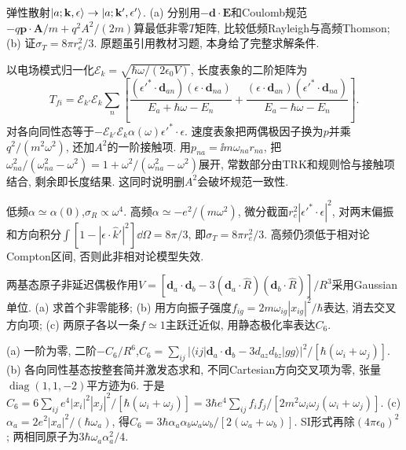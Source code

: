 \begin{exercise}弹性散射$\lvert a;\mathbf k,\epsilon\rangle\to\lvert a;\mathbf k',\epsilon'\rangle$. (a) 分别用$-\mathbf d\cdot\mathbf E$和Coulomb规范$-q\mathbf p\cdot\mathbf A/m+q^2A^2/(2m)$算最低非零$T$矩阵, 比较低频Rayleigh与高频Thomson; (b) 证$\sigma_T=8\pi r_e^2/3$. 原题虽引用教材习题, 本身给了完整求解条件.\end{exercise}
\begin{solution}以电场模式归一化$\mathcal E_k=\sqrt{\hbar\omega/(2\epsilon_0V)}$, 长度表象的二阶矩阵为
\[T_{fi}=\mathcal E_{k'}\mathcal E_k\sum_n\left[\frac{(\epsilon'^*\cdot\mathbf d_{an})(\epsilon\cdot\mathbf d_{na})}{E_a+\hbar\omega-E_n}+\frac{(\epsilon\cdot\mathbf d_{an})(\epsilon'^*\cdot\mathbf d_{na})}{E_a-\hbar\omega-E_n}\right].\]
对各向同性态等于$-\mathcal E_{k'}\mathcal E_k\alpha(\omega)\epsilon'^*\cdot\epsilon$. 速度表象把两偶极因子换为$p$并乘$q^2/(m^2\omega^2)$, 还加$A^2$的一阶接触项. 用$p_{na}=\ii m\omega_{na}r_{na}$, 把$\omega_{na}^2/(\omega_{na}^2-\omega^2)=1+\omega^2/(\omega_{na}^2-\omega^2)$展开, 常数部分由TRK和规则恰与接触项结合, 剩余即长度结果. 这同时说明删$A^2$会破坏规范一致性.

低频$\alpha\simeq\alpha(0)$,$\sigma_R\propto\omega^4$. 高频$\alpha\simeq-e^2/(m\omega^2)$, 微分截面$r_e^2|\epsilon'^*\cdot\epsilon|^2$, 对两末偏振和方向积分$\int[1-|\epsilon\cdot\hat k'|^2]\dd\Omega=8\pi/3$, 即$\sigma_T=8\pi r_e^2/3$. 高频仍须低于相对论Compton区间, 否则此非相对论模型失效.
\end{solution}
\begin{exercise}两基态原子非延迟偶极作用$V=[\mathbf d_a\cdot\mathbf d_b-3(\mathbf d_a\cdot\hat R)(\mathbf d_b\cdot\hat R)]/R^3$采用Gaussian单位. (a) 求首个非零能移; (b) 用方向振子强度$f_{ig}=2m\omega_{ig}|x_{ig}|^2/\hbar$表达, 消去交叉方向项; (c) 两原子各以一条$f\simeq1$主跃迁近似, 用静态极化率表达$C_6$.\end{exercise}
\begin{solution}(a) 一阶为零, 二阶$-C_6/R^6$,$C_6=\sum_{ij}|\langle ij|\mathbf d_a\cdot\mathbf d_b-3d_{az}d_{bz}|gg\rangle|^2/[\hbar(\omega_i+\omega_j)]$. (b) 各向同性基态按整套简并激发态求和, 不同Cartesian方向交叉项为零, 张量$\operatorname{diag}(1,1,-2)$平方迹为6. 于是$C_6=6\sum_{ij}e^4|x_i|^2|x_j|^2/[\hbar(\omega_i+\omega_j)]=3\hbar e^4\sum_{ij}f_if_j/[2m^2\omega_i\omega_j(\omega_i+\omega_j)]$. (c) $\alpha_a=2e^2|x_a|^2/(\hbar\omega_a)$, 得$C_6=3\hbar\alpha_a\alpha_b\omega_a\omega_b/[2(\omega_a+\omega_b)]$. SI形式再除$(4\pi\epsilon_0)^2$; 两相同原子为$3\hbar\omega_a\alpha_a^2/4$.
\end{solution}

